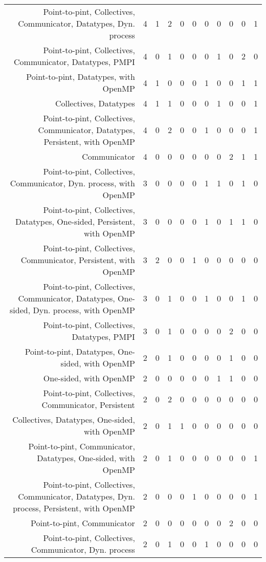 {\begin{landscape}
\begin{longtable}[htb]{r|c|c|c|c|c|c|c|c|c|c}
{Point-to-pint, Collectives, Communicator, Datatypes, Dyn. process} & 4 & 1 & 2 & 0 & 0 & 0 & 0 & 0 & 0 & 1 \\%
{Point-to-pint, Collectives, Communicator, Datatypes, PMPI} & 4 & 0 & 1 & 0 & 0 & 0 & 1 & 0 & 2 & 0 \\%
{Point-to-pint, Datatypes, with OpenMP} & 4 & 1 & 0 & 0 & 0 & 1 & 0 & 0 & 1 & 1 \\%
{Collectives, Datatypes} & 4 & 1 & 1 & 0 & 0 & 0 & 1 & 0 & 0 & 1 \\%
{Point-to-pint, Collectives, Communicator, Datatypes, Persistent, with OpenMP} & 4 & 0 & 2 & 0 & 0 & 1 & 0 & 0 & 0 & 1 \\%
{Communicator} & 4 & 0 & 0 & 0 & 0 & 0 & 0 & 2 & 1 & 1 \\%
{Point-to-pint, Collectives, Communicator, Dyn. process, with OpenMP} & 3 & 0 & 0 & 0 & 0 & 1 & 1 & 0 & 1 & 0 \\%
{Point-to-pint, Collectives, Datatypes, One-sided, Persistent, with OpenMP} & 3 & 0 & 0 & 0 & 0 & 1 & 0 & 1 & 1 & 0 \\%
{Point-to-pint, Collectives, Communicator, Persistent, with OpenMP} & 3 & 2 & 0 & 0 & 1 & 0 & 0 & 0 & 0 & 0 \\%
{Point-to-pint, Collectives, Communicator, Datatypes, One-sided, Dyn. process, with OpenMP} & 3 & 0 & 1 & 0 & 0 & 1 & 0 & 0 & 1 & 0 \\%
{Point-to-pint, Collectives, Datatypes, PMPI} & 3 & 0 & 1 & 0 & 0 & 0 & 0 & 2 & 0 & 0 \\%
{Point-to-pint, Datatypes, One-sided, with OpenMP} & 2 & 0 & 1 & 0 & 0 & 0 & 0 & 1 & 0 & 0 \\%
{One-sided, with OpenMP} & 2 & 0 & 0 & 0 & 0 & 0 & 1 & 1 & 0 & 0 \\%
{Point-to-pint, Collectives, Communicator, Persistent} & 2 & 0 & 2 & 0 & 0 & 0 & 0 & 0 & 0 & 0 \\%
{Collectives, Datatypes, One-sided, with OpenMP} & 2 & 0 & 1 & 1 & 0 & 0 & 0 & 0 & 0 & 0 \\%
{Point-to-pint, Communicator, Datatypes, One-sided, with OpenMP} & 2 & 0 & 1 & 0 & 0 & 0 & 0 & 0 & 0 & 1 \\%
{Point-to-pint, Collectives, Communicator, Datatypes, Dyn. process, Persistent, with OpenMP} & 2 & 0 & 0 & 0 & 1 & 0 & 0 & 0 & 0 & 1 \\%
{Point-to-pint, Communicator} & 2 & 0 & 0 & 0 & 0 & 0 & 0 & 2 & 0 & 0 \\%
{Point-to-pint, Collectives, Communicator, Dyn. process} & 2 & 0 & 1 & 0 & 0 & 1 & 0 & 0 & 0 & 0 \\%

\end{longtable}
\end{landscape}}
